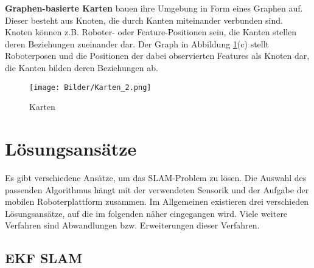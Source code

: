 \textbf{Graphen-basierte Karten} bauen ihre Umgebung in Form eines Graphen auf. Dieser besteht aus Knoten, die durch Kanten miteinander verbunden sind. Knoten können z.B. Roboter- oder Feature-Positionen sein, die Kanten stellen deren Beziehungen zueinander dar. Der Graph in Abbildung \ref{fig:karte}(c) stellt Roboterposen und die Positionen der dabei observierten Features als Knoten dar, die Kanten bilden deren Beziehungen ab.

\begin{figure}
\centering
\texttt{[image: Bilder/Karten\_2.png]}
\caption{Karten}
\label{fig:karte}
\end{figure}

\section[Lösungsansätze (Kopp)]{Lösungsansätze}

Es gibt verschiedene Ansätze, um das SLAM-Problem zu lösen. Die Auswahl des passenden Algorithmus hängt mit der verwendeten Sensorik und der Aufgabe der mobilen Roboterplattform zusammen. Im Allgemeinen existieren drei verschieden Lösungsansätze, auf die im folgenden näher eingegangen wird. Viele weitere Verfahren sind Abwandlungen bzw. Erweiterungen dieser Verfahren.

\subsection[EKF SLAM (Kopp)]{EKF SLAM}

